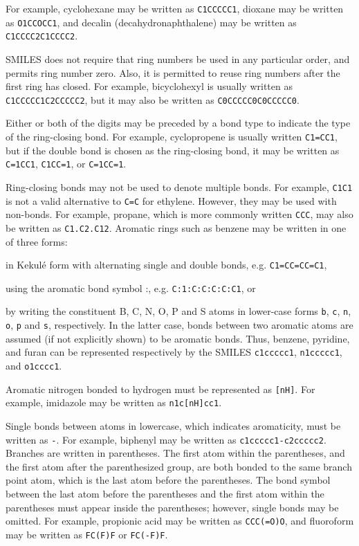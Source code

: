 \documentclass[a4paper,12pt]{report}
\begin{document}
For example, cyclohexane may be written as \texttt{C1CCCCC1}, dioxane may be written as \texttt{O1CCOCC1}, and decalin (decahydronaphthalene) may be written as \texttt{C1CCCC2C1CCCC2}.

SMILES does not require that ring numbers be used in any particular order, and permits ring number zero. Also, it is permitted to reuse ring numbers after the first ring has closed. For example, bicyclohexyl is usually written as \texttt{C1CCCCC1C2CCCCC2}, but it may also be written as \texttt{C0CCCCC0C0CCCCC0}.

Either or both of the digits may be preceded by a bond type to indicate the type of the ring-closing bond. For example, cyclopropene is usually written \texttt{C1=CC1}, but if the double bond is chosen as the ring-closing bond, it may be written as \texttt{C=1CC1}, \texttt{C1CC=1}, or \texttt{C=1CC=1}.

Ring-closing bonds may not be used to denote multiple bonds. For example, \texttt{C1C1} is not a valid alternative to \texttt{C=C} for ethylene. However, they may be used with non-bonds. For example, propane, which is more commonly written \texttt{CCC}, may also be written as \texttt{C1.C2.C12}.
Aromatic rings such as benzene may be written in one of three forms:
\ben
\item in Kekulé form with alternating single and double bonds, e.g. \texttt{C1=CC=CC=C1},
\item using the aromatic bond symbol :, e.g. \texttt{C:1:C:C:C:C:C1}, or
\item by writing the constituent B, C, N, O, P and S atoms in lower-case forms \texttt{b}, \texttt{c}, \texttt{n}, \texttt{o}, \texttt{p} and \texttt{s}, respectively.
\een
In the latter case, bonds between two aromatic atoms are assumed (if not explicitly shown) to be aromatic bonds. Thus, benzene, pyridine, and furan can be represented respectively by the SMILES \texttt{c1ccccc1}, \texttt{n1ccccc1}, and \texttt{o1cccc1}.

Aromatic nitrogen bonded to hydrogen must be represented as \texttt{[nH]}. For example, imidazole may be written as \texttt{n1c[nH]cc1}.

Single bonds between atoms in lowercase, which indicates aromaticity, must be written as \texttt{-}. For example, biphenyl may be written as \texttt{c1ccccc1-c2ccccc2}.
Branches are written in parentheses. The first atom within the parentheses, and the first atom after the parenthesized group, are both bonded to the same branch point atom, which is the last atom before the parentheses. The bond symbol between the last atom before the parentheses and the first atom within the parentheses must appear inside the parentheses; however, single bonds may be omitted. For example, propionic acid may be written as \texttt{CCC(=O)O}, and fluoroform may be written as \texttt{FC(F)F} or \texttt{FC(-F)F}.
\end{document}
